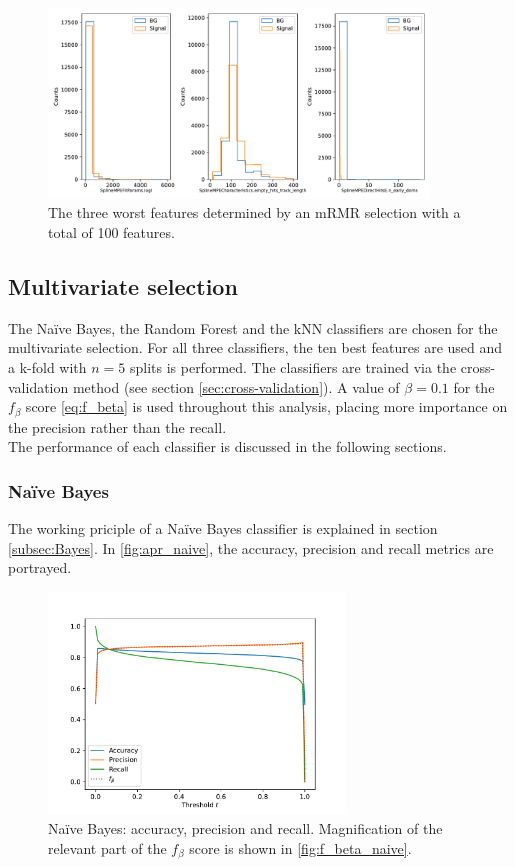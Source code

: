 \begin{figure}
    \centering
    \includegraphics[width=0.9\textwidth]{content/plots/worst_3_features.pdf}
    \caption{The three worst features determined by an mRMR selection with a total of 100 features.}
    \label{fig:worst_features}
\end{figure}

\subsection{Multivariate selection}
The Na\"ive Bayes, the Random Forest and the kNN classifiers are chosen for the multivariate selection. For all three classifiers, the ten best features are used and a k-fold with $n=\num{5}$ splits is performed. The classifiers are 
trained via the cross-validation method (see section \ref{sec:cross-validation}). A value of $\beta=0.1$ for the $f_{\beta}$ score \eqref{eq:f_beta} is used throughout this analysis, placing more importance on the precision rather 
than the recall. \\
The performance of each classifier is discussed in the following sections.

\subsubsection{Na\"ive Bayes}
The working priciple of a Na\"ive Bayes classifier is explained in section \ref{subsec:Bayes}. In \autoref{fig:apr_naive}, the accuracy, precision and recall metrics are portrayed.
\begin{figure}
    \centering
    \includegraphics[width=0.7\textwidth]{content/plots/apr_naive.pdf}
    \caption{Na\"ive Bayes: accuracy, precision and recall. Magnification of the relevant part of the $f_{\beta}$ score is shown in \autoref{fig:f_beta_naive}.} 
    \label{fig:apr_naive}
\end{figure}

